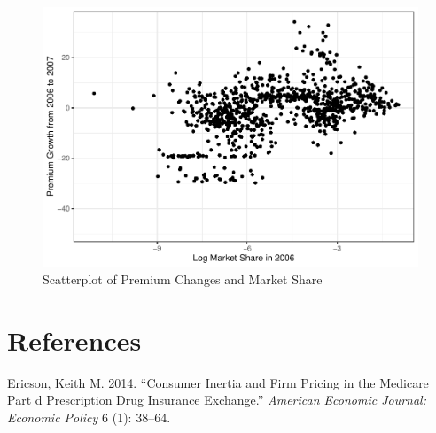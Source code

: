\documentclass[
  12pt,
]{article}
\newlength{\cslhangindent}
\newenvironment{cslreferences}%
  {\setlength{\parindent}{0pt}%
  \everypar{\setlength{\hangindent}{\cslhangindent}}\ignorespaces}%
  {\par}
\begin{document}
\begin{figure}
\centering
\includegraphics{solutions_files/figure-latex/scatter-1.pdf}
\caption{\label{fig:scatter}Scatterplot of Premium Changes and Market Share}
\end{figure}

\newpage

\hypertarget{references}{%
\section*{References}\label{references}}

\hypertarget{refs}{}
\begin{cslreferences}
\leavevmode\hypertarget{ref-ericson2014}{}%
Ericson, Keith M. 2014. ``Consumer Inertia and Firm Pricing in the Medicare Part d Prescription Drug Insurance Exchange.'' \emph{American Economic Journal: Economic Policy} 6 (1): 38--64.
\end{cslreferences}
\end{document}

